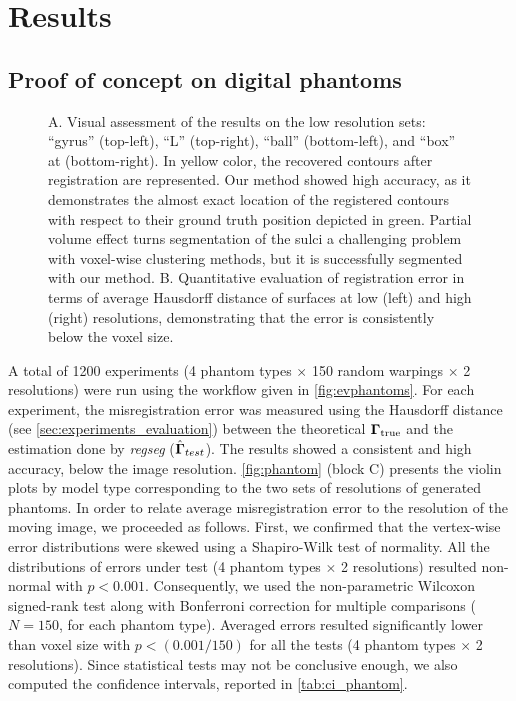 \section{Results}
\label{sec:results}

\subsection{Proof of concept on digital phantoms}
\label{sec:results_phantom}

\begin{figure*}
  \centering
  
  \caption{A. Visual assessment of the results on the low resolution sets:
    ``gyrus'' (top-left), ``L'' (top-right), ``ball'' (bottom-left),
    and ``box'' at (bottom-right).
  In yellow color, the recovered contours after registration are represented.
  Our method showed high accuracy, as it demonstrates the almost exact location of the registered
    contours with respect to their ground truth position depicted in green.
  Partial volume effect turns segmentation of the sulci a challenging problem with voxel-wise
    clustering methods, but it is successfully segmented with our method.
  B. Quantitative evaluation of registration error in terms of average Hausdorff distance of
    surfaces at low (left) and high (right) resolutions, demonstrating that the error is
    consistently below the voxel size.
    }\label{fig:phantom}
\end{figure*}
A total of 1200 experiments (4 phantom types $\times$ 150 random warpings $\times$ 2 resolutions) were
  run using the workflow given in \autoref{fig:evphantoms}.
For each experiment, the misregistration error was measured using the Hausdorff distance
  (see \autoref{sec:experiments_evaluation}) between the theoretical $\boldsymbol{\Gamma}_\text{true}$ and
  the estimation done by \emph{regseg} ($\hat{\boldsymbol{\Gamma}}_{test}$).
The results showed a consistent and high accuracy, below the image resolution.
\autoref{fig:phantom} (block C) presents the violin plots by model type corresponding
  to the two sets of resolutions of generated phantoms.
In order to relate average misregistration error to the resolution of the moving image,
  we proceeded as follows.
First, we confirmed that the vertex-wise error distributions were skewed using a Shapiro-Wilk test of
  normality.
All the distributions of errors under test (4 phantom types $\times$ 2 resolutions) resulted
  non-normal with $p<0.001$.
Consequently, we used the non-parametric Wilcoxon signed-rank test along with Bonferroni
  correction for multiple comparisons ($N=150$, for each phantom type).
Averaged errors resulted significantly lower than voxel size with $p < (0.001 / 150)$
  for all the tests (4 phantom types $\times$ 2 resolutions).
Since statistical tests may not be conclusive enough, we also computed the confidence intervals,
  reported in \autoref{tab:ci_phantom}.


